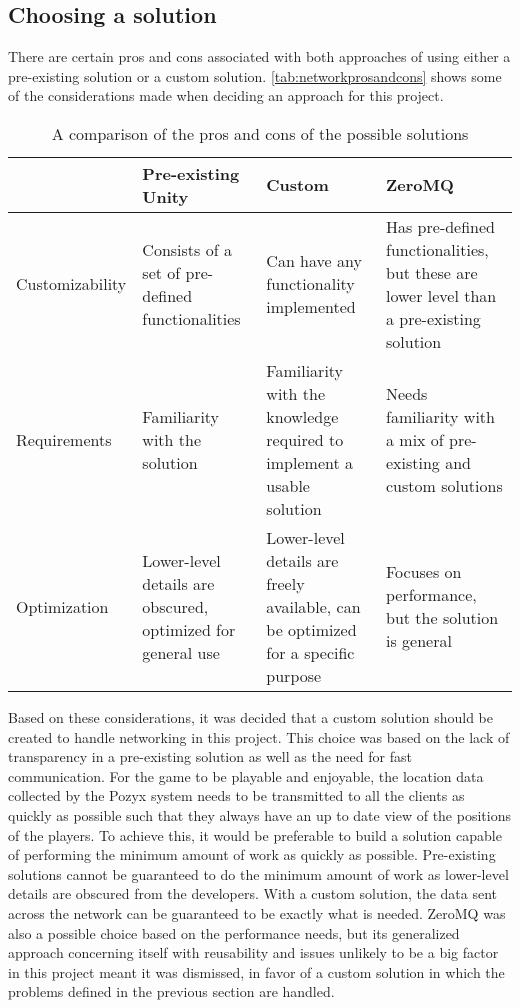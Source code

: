 \subsection{Choosing a solution}
There are certain pros and cons associated with both approaches of using either a pre-existing solution or a custom solution.
\autoref{tab:networkprosandcons} shows some of the considerations made when deciding an approach for this project.
\begin{table}[tbp]
    \begin{tabularx}{\textwidth}{|X|X|X|X|}
    \hline
                    & Pre-existing Unity                                                & Custom                                                                            & ZeroMQ                                                                                  \\ \hline
    Customizability & Consists of a set of pre-defined functionalities            & Can have any functionality implemented                                            & Has pre-defined functionalities, but these are lower level than a pre-existing solution \\ \hline
    Requirements    & Familiarity with the solution                               & Familiarity with the knowledge required to implement a usable solution            & Needs familiarity with a mix of pre-existing and custom solutions                     \\ \hline
    Optimization    & Lower-level details are obscured, optimized for general use & Lower-level details are freely available, can be optimized for a specific purpose & Focuses on performance, but the solution is general                                     \\ \hline
    \end{tabularx}
    \caption{A comparison of the pros and cons of the possible solutions}
    \label{tab:networkprosandcons}
\end{table}
Based on these considerations, it was decided that a custom solution should be created to handle networking in this project.
This choice was based on the lack of transparency in a pre-existing solution as well as the need for fast communication.
For the game to be playable and enjoyable, the location data collected by the Pozyx system needs to be transmitted to all the clients as quickly as possible such that they always have an up to date view of the positions of the players.
To achieve this, it would be preferable to build a solution capable of performing the minimum amount of work as quickly as possible.
Pre-existing solutions cannot be guaranteed to do the minimum amount of work as lower-level details are obscured from the developers.
With a custom solution, the data sent across the network can be guaranteed to be exactly what is needed.
ZeroMQ was also a possible choice based on the performance needs, but its generalized approach concerning itself with reusability and issues unlikely to be a big factor in this project meant it was dismissed, in favor of a custom solution in which the problems defined in the previous section are handled.

